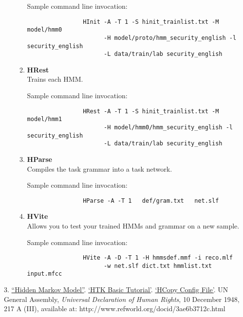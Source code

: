 \documentclass{wileySev}
\begin{document}
\begin{enumerate}
\begin{enumerate}
				Sample command line invocation: 
				\begin{verbatim}
				HInit -A -T 1 -S hinit_trainlist.txt -M model/hmm0 
				      -H model/proto/hmm_security_english -l security_english 
				      -L data/train/lab security_english
				\end{verbatim}
			\item \textbf{HRest}\\
				Trains each HMM.
			
				Sample command line invocation: 
				\begin{verbatim}
				HRest -A -T 1 -S hinit_trainlist.txt -M model/hmm1 
				      -H model/hmm0/hmm_security_english -l security_english 
				      -L data/train/lab security_english
				\end{verbatim}
			\item \textbf{HParse}\\
				Compiles the task grammar into a task network.
				
				Sample command line invocation: 
				\begin{verbatim}
				HParse -A -T 1   def/gram.txt   net.slf
				\end{verbatim}
			\item \textbf{HVite}\\
				Allows you to test your trained HMMs and grammar on a new sample.
			
				Sample command line invocation: 
				\begin{verbatim}
				HVite -A -D -T 1 -H hmmsdef.mmf -i reco.mlf 
				      -w net.slf dict.txt hmmlist.txt input.mfcc
				\end{verbatim}
		\end{enumerate}
\end{enumerate}


\begin{references}{3.}
\href{http://en.wikipedia.org/wiki/Hidden_Markov_model}{``Hidden Markov Model''}.
\href{http://www.labunix.uqam.ca/~boukadoum_m/DIC9315/Notes/Markov/HTK_basic_tutorial.pdf}{`HTK Basic Tutorial'}.
\href{http://www.voxforge.org/home/dev/acousticmodels/linux/create/htkjulius/tutorial/data-prep/step-5}{`HCopy Config File'}.
UN General Assembly,
		{\it Universal Declaration of Human Rights}, 10 December 1948, 217 A (III), available at: http://www.refworld.org/docid/3ae6b3712c.html 

\end{references}


\printindex
\end{document}
